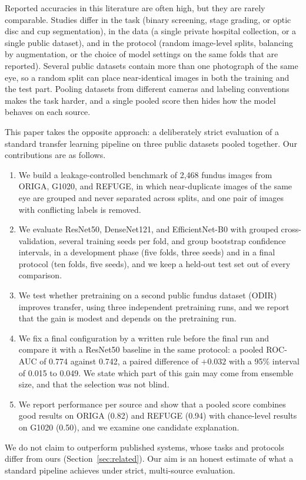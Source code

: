 Reported accuracies in this literature are often high, but they are rarely comparable. Studies differ in the task (binary screening, stage grading, or optic disc and cup segmentation), in the data (a single private hospital collection, or a single public dataset), and in the protocol (random image-level splits, balancing by augmentation, or the choice of model settings on the same folds that are reported). Several public datasets contain more than one photograph of the same eye, so a random split can place near-identical images in both the training and the test part. Pooling datasets from different cameras and labeling conventions makes the task harder, and a single pooled score then hides how the model behaves on each source.

This paper takes the opposite approach: a deliberately strict evaluation of a standard transfer learning pipeline on three public datasets pooled together. Our contributions are as follows.
\begin{enumerate}
\item We build a leakage-controlled benchmark of 2,468 fundus images from ORIGA, G1020, and REFUGE, in which near-duplicate images of the same eye are grouped and never separated across splits, and one pair of images with conflicting labels is removed.
\item We evaluate ResNet50, DenseNet121, and EfficientNet-B0 with grouped cross-validation, several training seeds per fold, and group bootstrap confidence intervals, in a development phase (five folds, three seeds) and in a final protocol (ten folds, five seeds), and we keep a held-out test set out of every comparison.
\item We test whether pretraining on a second public fundus dataset (ODIR) improves transfer, using three independent pretraining runs, and we report that the gain is modest and depends on the pretraining run.
\item We fix a final configuration by a written rule before the final run and compare it with a ResNet50 baseline in the same protocol: a pooled ROC-AUC of 0.774 against 0.742, a paired difference of $+0.032$ with a 95\% interval of 0.015 to 0.049. We state which part of this gain may come from ensemble size, and that the selection was not blind.
\item We report performance per source and show that a pooled score combines good results on ORIGA (0.82) and REFUGE (0.94) with chance-level results on G1020 (0.50), and we examine one candidate explanation.
\end{enumerate}
We do not claim to outperform published systems, whose tasks and protocols differ from ours (Section~\ref{sec:related}). Our aim is an honest estimate of what a standard pipeline achieves under strict, multi-source evaluation.


